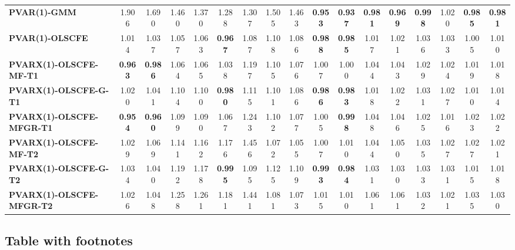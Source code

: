 \documentclass[Theme1]{{template_material/eurostat}}
\begin{document}
\begin{landscape}
\begin{table}[ht]
{\begin{tabular}{l|cc|cc|cc|cc|cc|cc|cc|cc}
\hline
\textbf{PVAR(1)-GMM} & 1.906 & 1.690 & 1.460 & 1.370 & 1.288 & 1.307 & 1.505 & 1.463 & \textbf{0.953} & \textbf{0.937} & \textbf{0.981} & \textbf{0.969} & \textbf{0.998} & 1.020 & \textbf{0.985} & \textbf{0.981} \\
\textbf{PVAR(1)-OLSCFE} & 1.014 & 1.037 & 1.057 & 1.063 & \textbf{0.967} & 1.087 & 1.108 & 1.086 & \textbf{0.988} & \textbf{0.985} & 1.017 & 1.021 & 1.036 & 1.033 & 1.005 & 1.010 \\
\textbf{PVARX(1)-OLSCFE-MF-T1} & \textbf{0.963} & \textbf{0.986} & 1.064 & 1.065 & 1.038 & 1.197 & 1.105 & 1.076 & 1.007 & 1.000 & 1.044 & 1.043 & 1.029 & 1.024 & 1.019 & 1.018 \\
\textbf{PVARX(1)-OLSCFE-G-T1} & 1.020 & 1.041 & 1.104 & 1.100 & \textbf{0.980} & 1.115 & 1.101 & 1.086 & \textbf{0.986} & \textbf{0.983} & 1.018 & 1.022 & 1.031 & 1.027 & 1.010 & 1.014 \\
\textbf{PVARX(1)-OLSCFE-MFGR-T1} & \textbf{0.954} & \textbf{0.960} & 1.099 & 1.090 & 1.067 & 1.243 & 1.102 & 1.077 & 1.005 & \textbf{0.998} & 1.048 & 1.046 & 1.025 & 1.016 & 1.023 & 1.022 \\
\textbf{PVARX(1)-OLSCFE-MF-T2} & 1.029 & 1.069 & 1.141 & 1.162 & 1.176 & 1.456 & 1.072 & 1.055 & 1.007 & 1.010 & 1.044 & 1.050 & 1.035 & 1.027 & 1.027 & 1.021 \\
\textbf{PVARX(1)-OLSCFE-G-T2} & 1.034 & 1.040 & 1.192 & 1.178 & \textbf{0.995} & 1.095 & 1.125 & 1.109 & \textbf{0.993} & \textbf{0.984} & 1.031 & 1.030 & 1.033 & 1.031 & 1.015 & 1.018 \\
\textbf{PVARX(1)-OLSCFE-MFGR-T2} & 1.026 & 1.048 & 1.258 & 1.261 & 1.181 & 1.441 & 1.081 & 1.073 & 1.015 & 1.010 & 1.061 & 1.061 & 1.032 & 1.021 & 1.035 & 1.030 \\
\hline
 
\end{tabular}
}

\end{table}


\end{landscape}







\restoregeometry
\pagestyle{numstyle}


\subsection{Table with footnotes}
\end{document}
